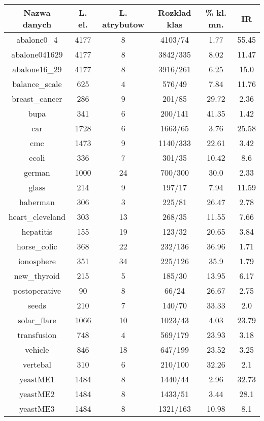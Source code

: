 \documentclass{article}%
\begin{document}
%
\normalsize%
\begin{tabular}{|c|c|c|c|c|c|}%
\hline%
Nazwa danych&L. el.&L. atrybutow&Rozklad klas&\% kl. mn.&IR\\%
\hline%
abalone0\_4&4177&8&4103/74&1.77&55.45\\%
abalone041629&4177&8&3842/335&8.02&11.47\\%
abalone16\_29&4177&8&3916/261&6.25&15.0\\%
balance\_scale&625&4&576/49&7.84&11.76\\%
breast\_cancer&286&9&201/85&29.72&2.36\\%
bupa&341&6&200/141&41.35&1.42\\%
car&1728&6&1663/65&3.76&25.58\\%
cmc&1473&9&1140/333&22.61&3.42\\%
ecoli&336&7&301/35&10.42&8.6\\%
german&1000&24&700/300&30.0&2.33\\%
glass&214&9&197/17&7.94&11.59\\%
haberman&306&3&225/81&26.47&2.78\\%
heart\_cleveland&303&13&268/35&11.55&7.66\\%
hepatitis&155&19&123/32&20.65&3.84\\%
horse\_colic&368&22&232/136&36.96&1.71\\%
ionosphere&351&34&225/126&35.9&1.79\\%
new\_thyroid&215&5&185/30&13.95&6.17\\%
postoperative&90&8&66/24&26.67&2.75\\%
seeds&210&7&140/70&33.33&2.0\\%
solar\_flare&1066&10&1023/43&4.03&23.79\\%
transfusion&748&4&569/179&23.93&3.18\\%
vehicle&846&18&647/199&23.52&3.25\\%
vertebal&310&6&210/100&32.26&2.1\\%
yeastME1&1484&8&1440/44&2.96&32.73\\%
yeastME2&1484&8&1433/51&3.44&28.1\\%
yeastME3&1484&8&1321/163&10.98&8.1\\%
\hline%
\end{tabular}%
\end{document}
